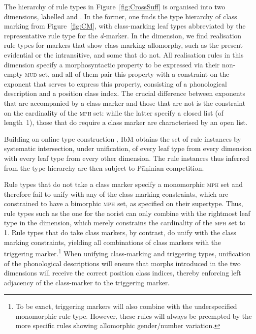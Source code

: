 \documentclass[output=paper]{langsci/langscibook}
\begin{document}
The hierarchy of rule types in Figure~\ref{fig:CrossSuff} is organised
into two dimensions, labelled  and
. In the former, one finds the type hierarchy of
class  marking from Figure~\ref{fig:CM}, with class-marking leaf types
abbreviated by the representative rule type for the
\textit{d-}marker. In the  dimension, we find
realisation rule types for markers that show class-marking allomorphy,
such as the present evidential or the intransitive, and some that do
not. All realisation rules in this dimension specify a morphosyntactic
property to be expressed via their non-empty \textsc{mud} set, and all
of them pair this property with a constraint on the exponent that
serves to express this property, consisting of a phonological
description and a position class index. The crucial difference between
exponents that are accompanied by a class marker and those that are not
is the constraint on the cardinality of the \textsc{mph} set: while
the latter specify a closed list (of length~1), those that do
require a class marker are characterised by an open list.

Building on online type construction \citep{Koenig94}, IbM obtains the
set of rule instances by systematic intersection, under unification,
of every leaf type from every dimension with every leaf type from
every other dimension. The rule instances thus inferred from the type
hierarchy are then subject to Pāṇinian competition.

Rule types that do not take a class marker specify a monomorphic
\textsc{mph} set and therefore fail to unify with any of the class
marking constraints, which are constrained to have a bimorphic
\textsc{mph} set, as specified on their supertype. Thus, rule types
such as the one for the aorist can only combine with the rightmost
leaf type in the  dimension, which merely
constrains the cardinality of the \textsc{mph} set to 1. Rule types
that do take class markers, by contrast, do unify with the class
marking constraints, yielding all combinations of class markers with
the triggering marker.\footnote{To be exact, triggering markers will
  also combine with the underspecified monomorphic rule type. However,
  these rules will always be preempted by the more specific rules
  showing allomorphic gender/number variation.} When unifying
class-marking and triggering types, unification of the phonological
descriptions will ensure that morphs introduced in the two dimensions
will receive the correct position class indices, thereby enforcing
left adjacency of the class-marker to the triggering marker.
\end{document}
